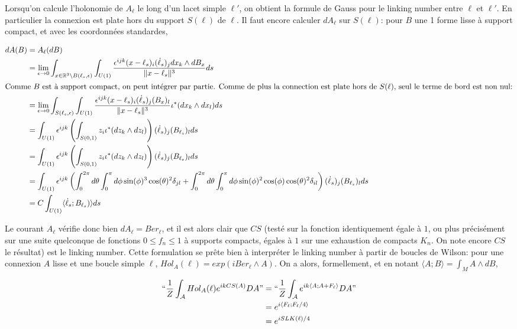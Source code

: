 \documentclass[10pt]{article}
\begin{document}
Lorsqu'on calcule l'holonomie de $A_\ell$ le long d'un lacet simple $\ell'$, on obtient la formule de Gauss pour le linking number entre $\ell$ et $\ell'$. En particulier la connexion est plate hors du support $S(\ell)$ de  $\ell$. Il faut encore calculer $dA_\ell$ sur $S(\ell)$: pour $B$ une 1 forme lisse à support compact, et avec les coordonnées standardes,

\begin{align*}
  dA(B)&=A_\ell(dB)\\
  &=\lim_{\epsilon\to 0}\int_{x\in\mathbb{R}^3\setminus B(\ell_s,\epsilon)} \int_{U(1)} \frac{\epsilon^{ijk}(x-\ell_s)_i(\dot\ell_s)_j dx_k\wedge dB_x}{\|x-\ell_s\|^3} ds\\
  \intertext{Comme $B$ est à support compact, on peut intégrer par partie. Comme de plus la connection est plate hors de $S(\ell)$, seul le terme de bord est non nul:}
  &=\lim_{\epsilon\to 0}\int_{S(\ell_s,\epsilon)}\int_{U(1)} \frac{\epsilon^{ijk}(x-\ell_s)_i(\dot\ell_s)_j  (B_x)_l}{\|x-\ell_s\|^3} \iota^*(dx_k\wedge dx_l) ds\\
  &=\int_{U(1)} \epsilon^{ijk} \left(\int_{S(0,1)}z_i   \iota^*(dz_k\wedge dz_l) \right) (\dot\ell_s)_j(B_{\ell_s})_l ds\\
  &=\int_{U(1)} \epsilon^{ijk} \left(\int_{S(0,1)}z_i   \iota^*(dz_k\wedge dz_l) \right) (\dot\ell_s)_j(B_{\ell_s})_l ds\\
  &=\int_{U(1)} \epsilon^{ijk} \left( \int_0^{2\pi} d\theta \int_0^{\pi} d\phi \sin(\phi)^3\cos(\theta)^2 \delta_{jl}+\int_0^{2\pi} d\theta \int_0^{\pi} d\phi \sin(\phi)^2 \cos(\phi) \cos(\theta)^2 \delta_{il} \right)(\dot\ell_s)_j(B_{\ell_s})_l ds\\
&=C \int_{U(1)} \langle \dot\ell_s;B_{\ell_s})\rangle ds
  \end{align*}

Le courant $A_\ell$ vérifie donc bien $dA_\ell=Ber_\ell$, et il est alors clair que $CS$ (testé sur la fonction identiquement égale à $1$, ou plus précisément sur une suite quelconque de fonctions $0\leq f_n\leq 1$ à supports compacts, égales à $1$ sur une exhaustion de compacts $K_n$. On note encore $CS$ le résultat) est le linking number. Cette formulation se prête bien à interpréter le linking number à partir de boucles de Wilson: pour une connexion $A$ lisse et une boucle simple $\ell$, $Hol_A(\ell)=exp(i Ber_\ell\wedge A)$. On a alors, formellement, et en notant $\langle A; B \rangle=\int_M A\wedge dB$,

\begin{align*}
  ``\frac{1}{Z}\int_{\mathcal{A}} Hol_A(\ell) e^{i k CS(A)} DA "&=``\frac{1}{Z}\int_{\mathcal{A}} e^{i k \langle A ;A+F_\ell \rangle } DA"\\
&=e^{i\langle F_\ell;F_\ell/4 \rangle}\\
&=e^{iSLK(\ell)/4}\\
\end{align*}
\end{document}
